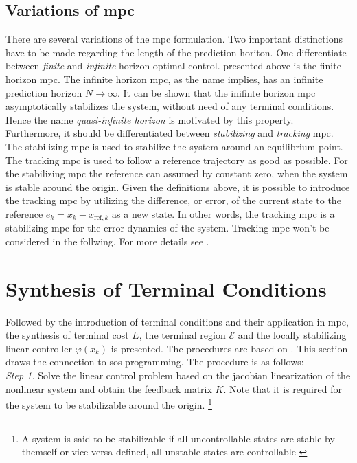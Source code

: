 \documentclass[10pt,a4paper,titlepage]{article}
\begin{document}
\subsection{Variations of \gls{mpc}}
There are several variations of the \gls{mpc} formulation. Two important distinctions have to be made regarding the length
of the prediction horiton. One differentiate between \textit{finite} and \textit{infinite} horizon optimal control. presented
above is the finite horizon \gls{mpc}. The infinite horizon \gls{mpc}, as the name implies, has an infinite prediction horizon
$N \rightarrow \infty$. It can be shown that the inifinte horizon \gls{mpc} asymptotically stabilizes the system, without need
of any terminal conditions. Hence the name \textit{quasi-infinite horizon} is motivated by this property.
Furthermore, it should be differentiated between \textit{stabilizing} and \textit{tracking} \gls{mpc}. The stabilizing \gls{mpc}
is used to stabilize the system around an equilibrium point. The tracking \gls{mpc} is used to follow
a reference trajectory as good as possible. For the stabilizing \gls{mpc} the reference can assumed by constant zero, when the 
system is stable around the origin. Given the definitions above, it is possible to introduce the tracking \gls{mpc} by utilizing
the difference, or error, of the current state to the reference $e_k = x_k - x_{\text{ref},k}$ as a new state. In other words,
the tracking \gls{mpc} is a stabilizing \gls{mpc} for the error dynamics of the system. Tracking \gls{mpc} won't be considered in
the follwing. For more details see \cite{nmpcBible}. 










\section{Synthesis of Terminal Conditions}
\label{sec:synTermCond}
Followed by the introduction of terminal conditions and their application in \gls{mpc}, the synthesis of terminal cost $E$, the
terminal region $\mathcal{E}$ and the locally stabilizing linear controller $\varphi(x_{k})$ is presented. The procedures are based
on \cite{CHEN19981205}. This section draws the connection to \gls{sos} programming. The procedure is as follows:\\

\textit{Step 1.} Solve the linear control problem based on the jacobian linearization of the nonlinear system and obtain the feedback
matrix $K$. Note that it is required for the system to be stabilizable around the origin. \footnote{A system is said to be stabilizable if
all uncontrollable states are stable by themself or vice versa defined, all unstable states are controllable \cite{lunze2016regelungstechnik}}\\
\end{document}
